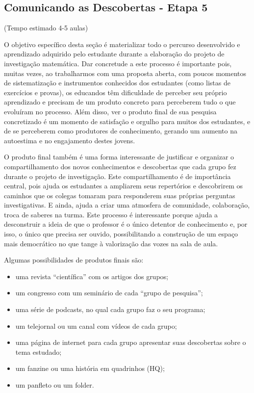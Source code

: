 \begin{paginatexto}
\section{Comunicando as Descobertas - Etapa 5}
(Tempo estimado 4-5 aulas)

O objetivo específico desta seção é materializar todo o percurso desenvolvido e aprendizado adquirido pelo estudante durante a elaboração do projeto de investigação matemática. Dar concretude a este processo é importante pois, muitas vezes, ao trabalharmos com uma proposta aberta, com poucos momentos de sistematização e instrumentos conhecidos dos estudantes (como listas de exercícios e provas), os educandos têm dificuldade de perceber seu próprio aprendizado e precisam de um produto concreto para perceberem tudo o que evoluíram no processo. 
Além disso, ver o produto final de sua pesquisa concretizado é um momento de satisfação e orgulho para muitos dos estudantes, e de se perceberem como produtores de conhecimento, gerando um aumento na autoestima e no engajamento destes jovens. 

O produto final também é uma forma interessante de justificar e organizar o compartilhamento dos novos conhecimentos e descobertas que cada grupo fez durante o projeto de investigação. Este compartilhamento é de importância central, pois ajuda os estudantes a ampliarem seus repertórios e descobrirem os caminhos que os colegas tomaram para responderem suas próprias perguntas investigativas. E ainda, ajuda a criar uma atmosfera de comunidade, colaboração, troca de saberes na turma. Este processo é interessante porque ajuda a desconstruir a ideia de que o professor é o único detentor de conhecimento e, por isso, o único que precisa ser ouvido, possibilitando a construção de um espaço mais democrático no que tange à valorização das vozes na sala de aula. 

Algumas possibilidades de produtos finais são:

\begin{itemize}
\item uma revista “científica” com os artigos dos grupos;
\item um congresso com um seminário de cada “grupo de pesquisa”;
\item uma série de podcasts, no qual cada grupo faz o seu programa;
\item um telejornal ou um canal com vídeos de cada grupo;
\item uma página de internet para cada grupo apresentar suas descobertas sobre o tema estudado;
\item um fanzine ou uma história em quadrinhos (HQ);
\item um panfleto ou um folder.
\end{itemize}


\end{paginatexto}
